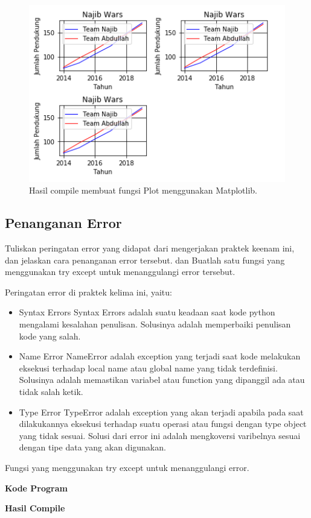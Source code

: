 \begin{figure}[H]
	\includegraphics[width=12cm]{figures/6/1174042/p4.png}
	\centering
	\caption{Hasil compile membuat fungsi Plot menggunakan Matplotlib.}
\end{figure}


\subsection{Penanganan Error}
Tuliskan  peringatan  error  yang  didapat  dari  mengerjakan  praktek  keenam  ini, dan  jelaskan  cara  penanganan  error  tersebut. dan  Buatlah  satu  fungsi  yang menggunakan try except untuk menanggulangi error tersebut.

\hfill \break
Peringatan error di praktek kelima ini, yaitu:
\begin{itemize}
	\item Syntax Errors
	Syntax Errors adalah suatu keadaan saat kode python mengalami kesalahan penulisan. Solusinya adalah memperbaiki penulisan kode yang salah.
	
	\item Name Error
	NameError adalah exception yang terjadi saat kode melakukan eksekusi terhadap local name atau global name yang tidak terdefinisi. Solusinya adalah memastikan variabel atau function yang dipanggil ada atau tidak salah ketik.
	
	\item Type Error
	TypeError adalah exception yang akan terjadi apabila pada saat dilakukannya eksekusi terhadap suatu operasi atau fungsi dengan type object yang tidak sesuai. Solusi dari error ini adalah mengkoversi varibelnya sesuai dengan tipe data yang akan digunakan.
\end{itemize}
\hfill \break
Fungsi yang menggunakan try except untuk menanggulangi error.

\hfill \break
\textbf{Kode Program}



\hfill \break
\textbf{Hasil Compile}
